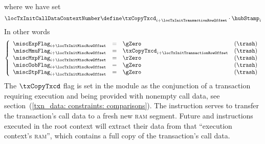 \begin{description}
\[			%
		\]
		where we have set
		\[
			\locTxInitCallDataContextNumber \define \txCopyTxcd _{i + \locTxInitTransactionRowOffset} \cdot \hubStamp_{i}
		\]
		\saNote{} In other words
		\[
			\left\{ \begin{array}{lclr}
				\miscExpFlag _{i + \locTxInitMiscRowOffset} & = & \gZero                                            & (\trash) \\
				\miscMmuFlag _{i + \locTxInitMiscRowOffset} & = & \txCopyTxcd _{i + \locTxInitTransactionRowOffset} & (\trash) \\
				\miscMxpFlag _{i + \locTxInitMiscRowOffset} & = & \rZero                                            & (\trash) \\
				\miscOobFlag _{i + \locTxInitMiscRowOffset} & = & \gZero                                            & (\trash) \\
				\miscStpFlag _{i + \locTxInitMiscRowOffset} & = & \gZero                                            & (\trash) \\
			\end{array} \right.
		\]
		\saNote{}
		\label{hub: initialization phase: transaction call data copy}
		The $\txCopyTxcd$ flag is set in the \txnDataMod{} module as the conjunction of a transaction requiring \evm{} execution and being provided with nonempty call data,
		see section~(\ref{txn_data: constraints: comparisons}).
		The \mmuMod{} instruction serves to transfer the transaction's call data to a fresh new \textsc{ram} segment.
		Future  and  instructions executed in the root context will extract their data from that ``execution context's \textsc{ram}'', which contains a full copy of the transaction's call data.


\end{description}
